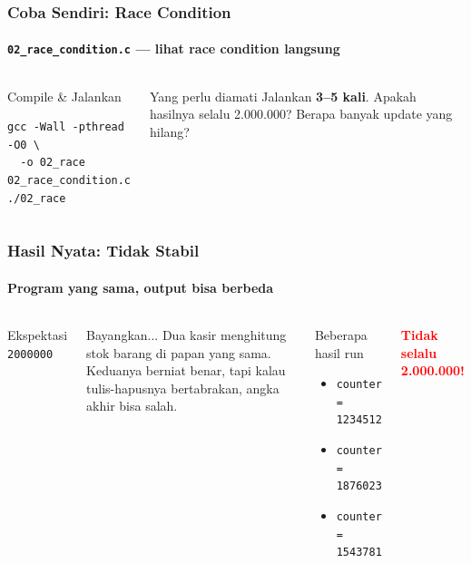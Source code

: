\documentclass[t,aspectratio=169,xcolor=dvipsnames]{beamer}
\newcommand{\tem}[1]{\textbf{\textcolor{red}{#1}}}
\begin{document}
\begin{frame}[fragile]
    \frametitle{Coba Sendiri: Race Condition}
    \framesubtitle{\texttt{02\_race\_condition.c} — lihat race condition langsung}
    \small

    \begin{columns}[T]
        \begin{block}{Compile \& Jalankan}
            \begin{lstlisting}[basicstyle=\ttfamily\scriptsize]
gcc -Wall -pthread -O0 \
  -o 02_race 02_race_condition.c
./02_race
            \end{lstlisting}
        \end{block}

        \begin{alertblock}{Yang perlu diamati}
            Jalankan \textbf{3--5 kali}. Apakah hasilnya selalu 2.000.000? Berapa banyak update yang hilang?
        \end{alertblock}
    \end{columns}
\end{frame}

\begin{frame}
    \frametitle{Hasil Nyata: Tidak Stabil}
    \framesubtitle{Program yang sama, output bisa berbeda}
    \small

    \begin{columns}[T]
        \begin{block}{Ekspektasi}
            \centering
            \Large\texttt{2000000}
        \end{block}

        \vspace{0.2cm}
        \begin{exampleblock}{Bayangkan...}
            Dua kasir menghitung stok barang di papan yang sama. Keduanya berniat benar, tapi kalau tulis-hapusnya bertabrakan, angka akhir bisa salah.
        \end{exampleblock}

        \begin{alertblock}{Beberapa hasil run}
            \begin{itemize}
                \item \texttt{counter = 1234512}
                \item \texttt{counter = 1876023}
                \item \texttt{counter = 1543781}
            \end{itemize}
        \end{alertblock}

        \vspace{0.15cm}
        \centering
        \Large\tem{Tidak selalu 2.000.000!}
    \end{columns}
\end{frame}
\end{document}
